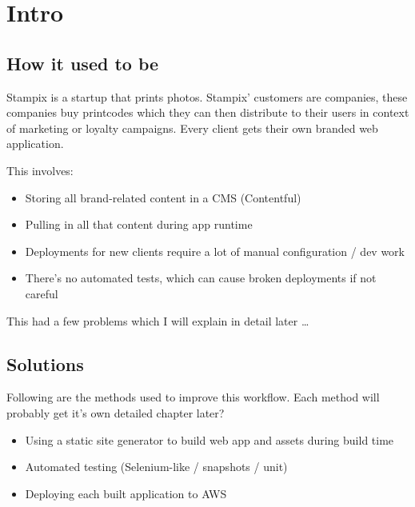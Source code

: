 \chapter{Intro} %

\label{Chapter1} %


\newcommand{\keyword}[1]{\textbf{#1}}
\newcommand{\tabhead}[1]{\textbf{#1}}
\newcommand{\code}[1]{\texttt{#1}}
\newcommand{\file}[1]{\texttt{\bfseries#1}}
\newcommand{\option}[1]{\texttt{\itshape#1}}


\section{How it used to be}

Stampix is a startup that prints photos. Stampix' customers are companies, these companies buy printcodes which they can then distribute to their users in context of marketing or loyalty campaigns. Every client gets their own branded web application.

This involves:

\begin{itemize}
	\item Storing all brand-related content in a CMS (Contentful)
	\item Pulling in all that content during app runtime
	\item Deployments for new clients require a lot of manual configuration / dev work
	\item There's no automated tests, which can cause broken deployments if not careful
\end{itemize}

This had a few problems which I will explain in detail later \ldots


\section{Solutions}

Following are the methods used to improve this workflow. Each method will probably get it's own detailed chapter later?

\begin{itemize}
	\item Using a static site generator to build web app and assets during build time
	\item Automated testing (Selenium-like / snapshots / unit)
	\item Deploying each built application to AWS
\end{itemize}